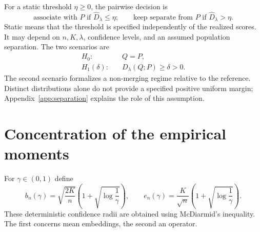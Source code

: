\documentclass[11pt,a4paper]{article}
\theoremstyle{definition}
\theoremstyle{remark}
\newcommand{\D}{D_\lambda(Q;P)}
\newcommand{\Dh}{\widehat D_\lambda}
\begin{document}
For a static threshold $\eta\ge0$, the pairwise decision is
\begin{equation}\label{eq:decision}
 \text{associate with }P\text{ if }\Dh\le\eta;
 \qquad\text{keep separate from }P\text{ if }\Dh>\eta.
\end{equation}
Static means that the threshold is specified independently of the
realized scores. It may depend on $n,K,\lambda$, confidence levels,
and an assumed population separation.
The two scenarios are
\begin{align}
 H_0:&\quad Q=P,\label{eq:H0}\\
 H_1(\delta):&\quad \D\ge\delta>0.\label{eq:H1}
\end{align}
The second scenario formalizes a non-merging regime relative to the
reference. Distinct distributions alone do not provide a specified
positive uniform margin; Appendix~\ref{app:separation} explains the
role of this assumption.

\section{Concentration of the empirical moments}\label{sec:concentration}

For $\gamma\in(0,1)$ define
\begin{equation}\label{eq:radii}
 b_n(\gamma)=\sqrt{\frac{2K}{n}}
        \left(1+\sqrt{\log\frac1\gamma}\right),\qquad
 e_n(\gamma)=\frac K{\sqrt n}
        \left(1+\sqrt{\log\frac1\gamma}\right).
\end{equation}
These deterministic confidence radii are obtained using McDiarmid's
inequality. The first concerns mean embeddings, the second an operator.
\end{document}
